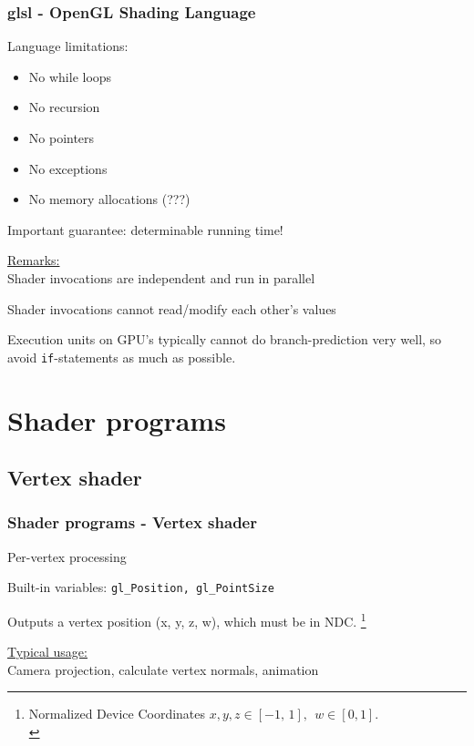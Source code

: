 \documentclass{beamer}
\begin{document}
%
%
%
\begin{frame}
\frametitle{glsl - OpenGL Shading Language}
Language limitations:
\begin{itemize}
\item No while loops
\item No recursion
\item No pointers
\item No exceptions
\item No memory allocations (???)
\end{itemize}
Important guarantee: determinable running time!

\vspace{3mm}\underline{Remarks:}\\\vspace{1mm}
Shader invocations are independent and run in parallel

Shader invocations cannot read/modify each other's values

Execution units on GPU's typically cannot do branch-prediction very well,
so avoid \texttt{if}-statements as much as possible.
\end{frame}


%
%
%
\section{Shader programs}

\subsection{Vertex shader}
\begin{frame}
\frametitle{Shader programs - Vertex shader}

Per-vertex processing

Built-in variables: \texttt{gl\_Position, gl\_PointSize}

Outputs a vertex position (x, y, z, w), which must be in NDC.
\footnote{Normalized Device Coordinates $x,y,z \in [-1,\,1],\ \ w \in [0,1]$.\\}

\vspace{5mm}
\underline{Typical usage:}\\\vspace{1mm}
Camera projection, calculate vertex normals, animation
\end{frame}


%
%
%
\end{document}
